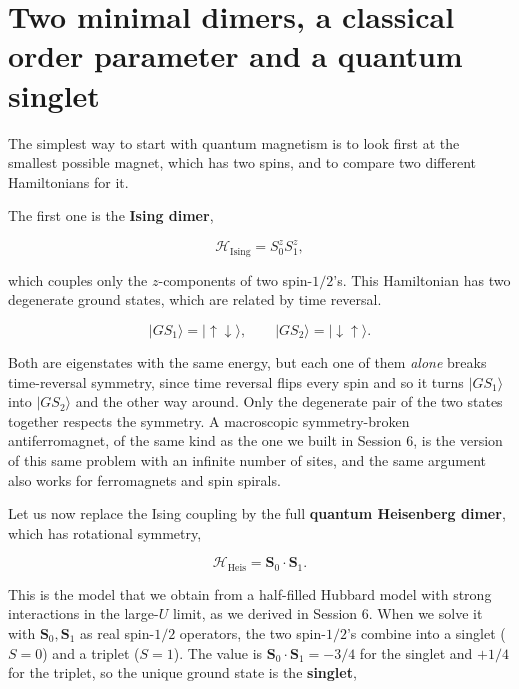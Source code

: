 

\section{Two minimal dimers, a classical order parameter and a quantum singlet}

The simplest way to start with quantum magnetism is to look first at the smallest possible magnet,
which has two spins, and to compare two different Hamiltonians for it.

The first one is the \textbf{Ising dimer},

\begin{equation}
\mathcal H_\text{Ising} = S_0^z S_1^z,
\end{equation}

which couples only the $z$-components of two spin-$1/2$'s. This Hamiltonian has two degenerate
ground states, which are related by time reversal.

\begin{equation*}
|GS_1\rangle = |{\uparrow\downarrow}\rangle, \qquad |GS_2\rangle = |{\downarrow\uparrow}\rangle.
\end{equation*}

Both are eigenstates with the same energy, but each one of them \emph{alone} breaks time-reversal
symmetry, since time reversal flips every spin and so it turns $|GS_1\rangle$ into $|GS_2\rangle$
and the other way around. Only the degenerate pair of the two states together respects the
symmetry. A macroscopic symmetry-broken antiferromagnet, of the same kind as the one we built in
Session 6, is the version of this same problem with an infinite number of sites, and the same
argument also works for ferromagnets and spin spirals.

Let us now replace the Ising coupling by the full \textbf{quantum Heisenberg dimer}, which has
rotational symmetry,

\begin{equation}
\mathcal H_\text{Heis} = \mathbf S_0 \cdot \mathbf S_1.
\end{equation}

This is the model that we obtain from a half-filled Hubbard model with strong interactions in the
large-$U$ limit, as we derived in Session 6. When we solve it with $\mathbf S_0, \mathbf S_1$ as
real spin-$1/2$ operators, the two spin-$1/2$'s combine into a singlet ($S=0$) and a triplet
($S=1$). The value is $\mathbf S_0\cdot\mathbf S_1 = -3/4$ for the singlet and $+1/4$ for the
triplet, so the unique ground state is the \textbf{singlet},

